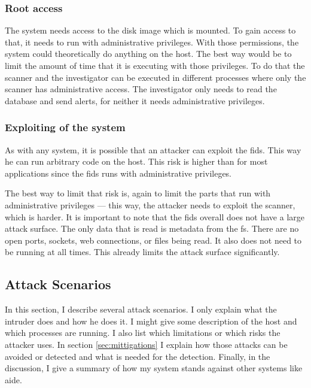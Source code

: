 \subsubsection{Root access}
\label{sec:risk:root}

The system needs access to the disk image which is mounted. To gain access to that, it needs to run with administrative privileges. With those permissions, the system could theoretically do anything on the host. The best way would be to limit the amount of time that it is executing with those privileges. To do that the scanner and the investigator can be executed in different processes where only the scanner has administrative access. The investigator only needs to read the database and send alerts, for neither it needs administrative privileges.

\subsubsection{Exploiting of the system}
\label{sec:risk:exploiting}

As with any system, it is possible that an attacker can exploit the \gls{fids}. This way he can run arbitrary code on the host. This risk is higher than for most applications since the \gls{fids} runs with administrative privileges.

The best way to limit that risk is, again to limit the parts that run with administrative privileges — this way, the attacker needs to exploit the scanner, which is harder. It is important to note that the \gls{fids} overall does not have a large attack surface. The only data that is read is metadata from the \gls{fs}. There are no open ports, sockets, web connections, or files being read. It also does not need to be running at all times. This already limits the attack surface significantly.

\subsection{Attack Scenarios}
\label{sec:attack_scenarios}

In this section, I describe several attack scenarios. I only explain what the intruder does and how he does it. I might give some description of the host and which processes are running. I also list which limitations or which risks the attacker uses. In section \ref{sec:mittigations} I explain how those attacks can be avoided or detected and what is needed for the detection. Finally, in the discussion, I give a summary of how my system stands against other systems like \gls{aide}. 

